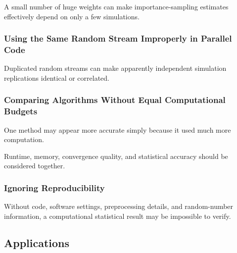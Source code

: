A small number of huge weights can make importance-sampling estimates
effectively depend on only a few simulations.

\subsubsection{Using the Same Random Stream Improperly in Parallel Code}

Duplicated random streams can make apparently independent simulation
replications identical or correlated.

\subsubsection{Comparing Algorithms Without Equal Computational Budgets}

One method may appear more accurate simply because it used much more
computation.

Runtime, memory, convergence quality, and statistical accuracy should be
considered together.

\subsubsection{Ignoring Reproducibility}

Without code, software settings, preprocessing details, and random-number
information, a computational statistical result may be impossible to
verify.

\subsection{Applications}
\label{subsec:computational-statistics-applications}

